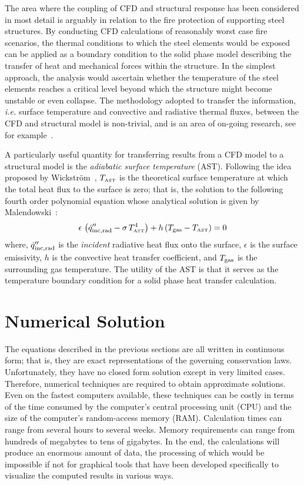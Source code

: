 \documentclass[graybox]{svmult}
\begin{document}
The area where the coupling of CFD and structural response has been considered in most detail is arguably in relation to the fire protection of supporting steel structures. By conducting CFD calculations of reasonably worst case fire scenarios, the thermal conditions to which the steel elements would be exposed can be applied as a boundary condition to the solid phase model describing the transfer of heat and mechanical forces within the structure. In the simplest approach, the analysis would ascertain whether the temperature of the steel elements reaches a critical level beyond which the structure might become unstable or even collapse. The methodology adopted to transfer the information, {\em i.e.} surface temperature and convective and radiative thermal fluxes, between the CFD and structural model is non-trivial, and is an area of on-going research, see for example~\cite{Welch}.

A particularly useful quantity for transferring results from a CFD model to a structural model is the {\em adiabatic surface temperature} (AST). Following the idea proposed by Wickstr\"{o}m~\cite{Wickstrom:Interflam2007}, $T_{\hbox{\tiny AST}}$ is the theoretical surface temperature at which the total heat flux to the surface is zero; that is, the solution to the following fourth order polynomial equation whose analytical solution is given by Malendowski~\cite{Malendowski:FT}:
\begin{equation}
   \epsilon \, \left( \dot{q}_{\rm inc,rad}'' - \sigma \, T_{\hbox{\tiny AST}}^4 \right) + h \, (T_{\rm gas} - T_{\hbox{\tiny AST}}) = 0
\end{equation}
where, $\dot{q}_{\rm inc,rad}''$ is the {\em incident} radiative heat flux onto the surface, $\epsilon$ is the surface emissivity, $h$ is the convective heat transfer coefficient, and $T_{\rm gas}$ is the surrounding gas temperature. The utility of the AST is that it serves as the temperature boundary condition for a solid phase heat transfer calculation. 


\section{Numerical Solution}

The  equations  described  in  the  previous  sections are all written in continuous form; that is, they are exact representations of the governing conservation laws. Unfortunately, they have no closed form solution except in very limited cases. Therefore, numerical techniques are required to obtain approximate solutions. Even on the fastest computers available, these techniques can be costly in terms of the time consumed by the computer's central processing unit (CPU) and the size of the computer's random-access memory (RAM). Calculation times can range from several hours to several weeks. Memory requirements can range from hundreds of megabytes to tens of gigabytes. In the end, the calculations will produce an enormous amount of data, the processing of which would be impossible if not for graphical tools that have been developed specifically to visualize the computed results in various ways.
\end{document}
